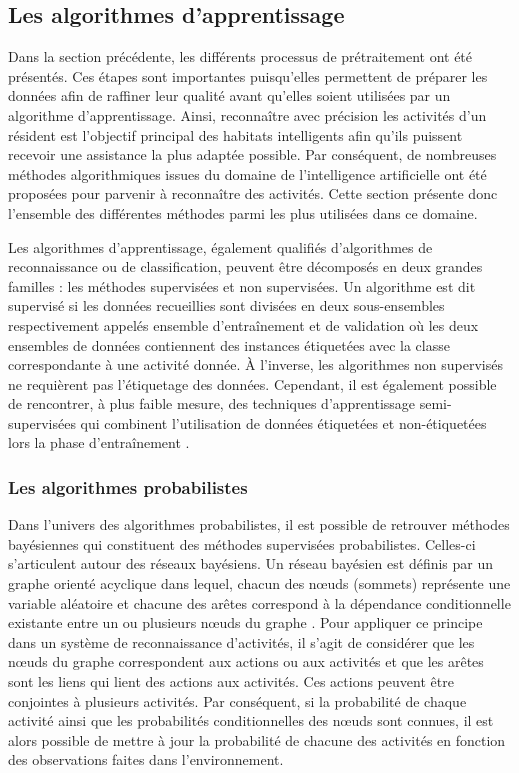 \subsection{Les algorithmes d'apprentissage}
\label{sec:algos}

Dans la section précédente, les différents processus de prétraitement ont été présentés. Ces étapes sont importantes puisqu'elles permettent de préparer les données afin de raffiner leur qualité avant qu'elles soient utilisées par un algorithme d'apprentissage. Ainsi, reconnaître avec précision les activités d'un résident est l'objectif principal des habitats intelligents afin qu'ils puissent recevoir une assistance la plus adaptée possible. Par conséquent, de nombreuses méthodes algorithmiques issues du domaine de l'intelligence artificielle ont été proposées pour parvenir à reconnaître des activités. Cette section présente donc l'ensemble des différentes méthodes parmi les plus utilisées dans ce domaine.

Les algorithmes d'apprentissage, également qualifiés d'algorithmes de reconnaissance ou de classification, peuvent être décomposés en deux grandes familles : les méthodes supervisées et non supervisées. Un algorithme est dit supervisé si les données recueillies sont divisées en deux sous-ensembles respectivement appelés ensemble d'entraînement et de validation où les deux ensembles de données contiennent des instances étiquetées avec la classe correspondante à une activité donnée. À l'inverse, les algorithmes non supervisés ne requièrent pas l'étiquetage des données. Cependant, il est également possible de rencontrer, à plus faible mesure, des techniques d'apprentissage semi-supervisées qui combinent l'utilisation de données étiquetées et non-étiquetées lors la phase d'entraînement \citep{Zhu2005, Chapelle2006}.

\subsubsection{Les algorithmes probabilistes}

Dans l'univers des algorithmes probabilistes, il est possible de retrouver méthodes bayésiennes qui constituent des méthodes supervisées probabilistes. Celles-ci s'articulent autour des réseaux bayésiens. Un réseau bayésien est définis par un graphe orienté acyclique dans lequel, chacun des n\oe{}uds (sommets) représente une variable aléatoire et chacune des arêtes correspond à la dépendance conditionnelle existante entre un ou plusieurs n\oe{}uds du graphe \citep{Heckerman1995}. Pour appliquer ce principe dans un système de reconnaissance d'activités, il s'agit de considérer que les n\oe{}uds du graphe correspondent aux actions ou aux activités et que les arêtes sont les liens qui lient des actions aux activités. Ces actions peuvent être conjointes à plusieurs activités. Par conséquent, si la probabilité de chaque activité ainsi que les probabilités conditionnelles des n\oe{}uds sont connues, il est alors possible de mettre à jour la probabilité de chacune des activités en fonction des observations faites dans l’environnement.

